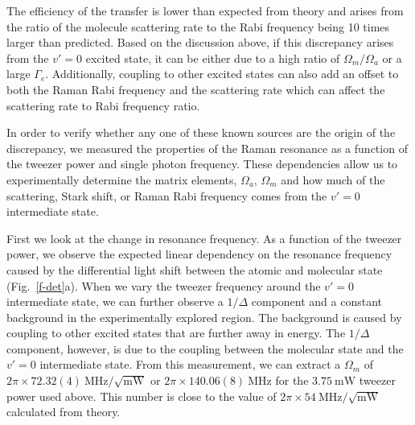 \documentclass[aps,prl,twocolumn,10pt,superscriptaddress]{revtex4-1}
\newcommand{\todo}[1]{}
\begin{document}
The efficiency of the transfer is lower than expected from theory and arises from the ratio of the molecule scattering rate to the Rabi frequency being 10 times larger than predicted.
Based on the discussion above, if this discrepancy arises from the $v'=0$ excited state,
it can be either due to a high ratio of $\Omega_m / \Omega_a$ or a large $\Gamma_e$.
Additionally, coupling to other excited states can also add an offset to
both the Raman Rabi frequency and the scattering rate
which can affect the scattering rate to Rabi frequency ratio.

In order to verify whether any one of these known sources are the origin of the discrepancy,
we measured the properties of the Raman resonance as a function of the tweezer power and single photon frequency.
These dependencies allow us to experimentally determine the matrix elements,
$ \Omega_a $, $\Omega_m $ and how much of the scattering, Stark shift,
or Raman Rabi frequency comes from the $ v' = 0$ intermediate state.

First we look at the change in resonance frequency.
As a function of the tweezer power,
we observe the expected linear dependency on the resonance frequency
caused by the differential light shift between the atomic and molecular state (Fig.~\ref{f-det}a).
When we vary the tweezer frequency around the $v'=0$ intermediate state,
we can further observe a $1/\Delta$ component
and a constant background in the experimentally explored region.
The background is caused by coupling to other excited states that are further away in energy.
The $1/\Delta$ component, however, is due to the coupling between the molecular state
and the $v'=0$ intermediate state.
From this measurement, we can extract a $\Omega_m$ of
$2\pi\times72.32(4) ~\mathrm{MHz}/\sqrt{\mathrm{mW}}$ or
$2\pi\times140.06(8) ~\mathrm{MHz}$ for the $3.75~\mathrm{mW}$ tweezer power used above.
This number is close to the value of
$2\pi\times54 ~\mathrm{MHz}/\sqrt{\mathrm{mW}}$ calculated from theory. \todo{ref/sm theory}
\end{document}
